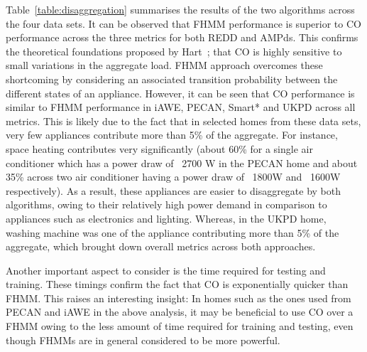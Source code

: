 \documentclass{sig-alternate}
\newcommand{\tabref}[1]{Table~\ref{#1}}
\begin{document}
\tabref{table:disaggregation} summarises the results of the two algorithms across the four data sets. It can be observed that FHMM performance is superior to CO performance across the three metrics for both REDD and AMPds. This confirms the theoretical foundations proposed by Hart~\cite{hart_1992}; that CO is highly sensitive to small variations in the aggregate load. FHMM approach overcomes these shortcoming by considering an associated transition probability between the different states of an appliance. However, it can be seen that CO performance is similar to FHMM performance in iAWE, PECAN, Smart* and UKPD across all metrics. This is likely due to the fact that in selected homes from these data sets, very few appliances contribute more than 5\% of the aggregate. For instance, space heating contributes very significantly (about 60\% for a single air conditioner which has a power draw of ~2700 W in the PECAN home and about 35\% across two air conditioner having a power draw of ~1800W and ~1600W respectively). As a result, these appliances are easier to disaggregate by both algorithms, owing to their relatively high power demand in comparison to appliances such as electronics and lighting. Whereas, in the UKPD home, washing machine was one of the appliance contributing more than 5\% of the aggregate, which brought down overall metrics across both approaches. 

Another important aspect to consider is the time required for testing and training. These timings confirm the fact that CO is exponentially quicker than FHMM. This raises an interesting insight: In homes such as the ones used from PECAN and iAWE in the above analysis, it may be beneficial to use CO over a FHMM owing to the less amount of time required for training and testing, even though FHMMs are in general considered to be more powerful.
\end{document}

